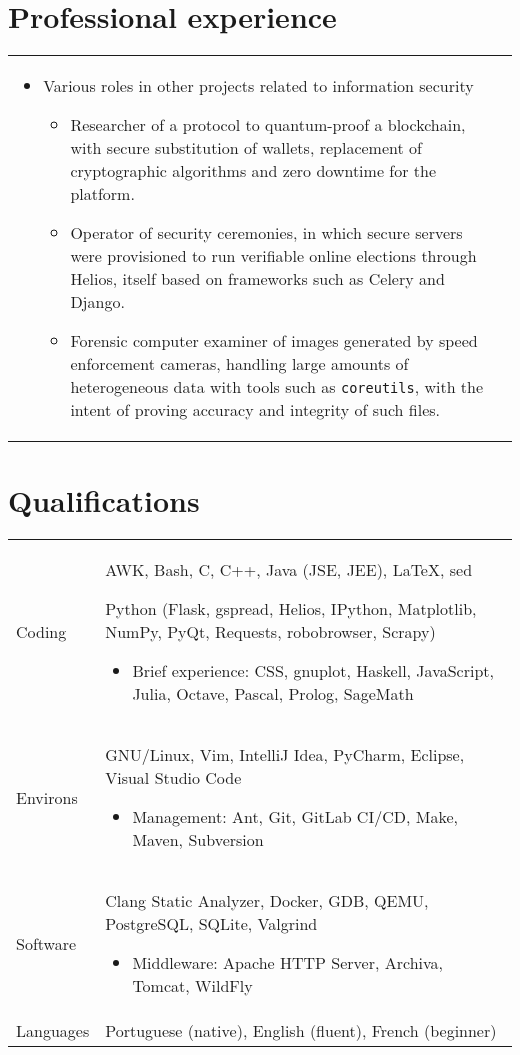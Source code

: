 \documentclass{article}
\newenvironment{contenttable}[1]
  {\section*{#1}
   \newcolumntype{L}{>{\bf \raggedleft}p{0.1\textwidth}}
   \newcolumntype{R}{p{0.82\textwidth}}
   \begin{tabular}{L!{\color{lightgray} \vrule}R}}
  {\end{tabular}}
\begin{document}
\begin{contenttable}{Professional experience}
\begin{itemize}
\begin{itemize}
    \end{itemize}
    \item Various roles in other projects related to information security
    \begin{itemize}
      \item Researcher of a protocol to quantum-proof a blockchain, with
          secure substitution of wallets, replacement of cryptographic
            algorithms and zero downtime for the platform.
      \item Operator of security ceremonies, in which secure servers were
          provisioned to run verifiable online elections through Helios, itself
            based on frameworks such as Celery and Django.
      \item Forensic computer examiner of images generated by speed enforcement
          cameras, handling large amounts of heterogeneous data with tools such
            as \texttt{coreutils}, with the intent of proving accuracy and
            integrity of such files.
    \end{itemize}
    \vspace{-5mm}
  \end{itemize}
\end{contenttable}

\begin{contenttable}{Qualifications}
  Coding & AWK, Bash, C, C++, Java (JSE, JEE), \LaTeX{}, sed

           Python (Flask, gspread, Helios, IPython, Matplotlib, NumPy, PyQt,
           Requests, robobrowser, Scrapy)
  \begin{itemize}
    \item Brief experience: CSS, gnuplot, Haskell, JavaScript, Julia, Octave,
        Pascal, Prolog, SageMath
    \vspace{-4mm}
  \end{itemize} \\

  Environs & GNU/Linux, Vim, IntelliJ Idea, PyCharm, Eclipse, Visual Studio
    Code
  \begin{itemize}
    \item Management: Ant, Git, GitLab CI/CD, Make, Maven, Subversion
    \vspace{-4mm}
  \end{itemize} \\

  Software & Clang Static Analyzer, Docker, GDB, QEMU, PostgreSQL, SQLite,
    Valgrind
  \begin{itemize}
    \item Middleware: Apache HTTP Server, Archiva, Tomcat, WildFly
    \vspace{-4mm}
  \end{itemize} \\

  Languages & Portuguese (native), English (fluent), French (beginner)
\end{contenttable}
\end{document}
